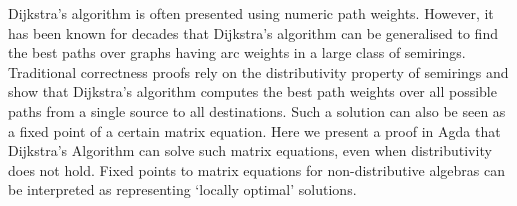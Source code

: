 Dijkstra's algorithm is often presented using numeric path weights.
However, it has been known for decades that Dijkstra's algorithm can be generalised to find the best paths over graphs having arc weights in a large class of semirings.
Traditional correctness proofs rely on the distributivity property of semirings and show that Dijkstra's algorithm computes the best path weights over all possible paths from a single source to all destinations.
Such a solution can also be seen as a fixed point of a certain matrix equation.
Here we present a proof in Agda that Dijkstra's Algorithm can solve such matrix equations, even when distributivity does not hold.
Fixed points to matrix equations for non-distributive algebras can be interpreted as representing `locally optimal' solutions.

